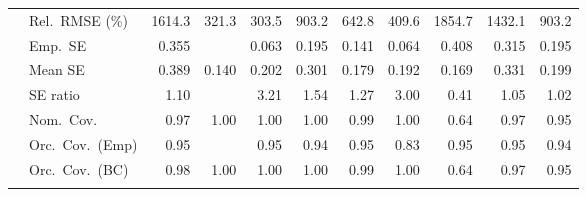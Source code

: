 \begin{landscape}
\begin{longtable}{llrrrrrrrrr}
 & Rel.\ RMSE (\%) & 1614.3 & \cellcolor{ranktwo}321.3 & \cellcolor{rankone}303.5 & 903.2 & 642.8 & \cellcolor{rankthree}409.6 & 1854.7 & 1432.1 & 903.2 \\
 & Emp.\ SE & 0.355 &  & 0.063 & 0.195 & 0.141 & 0.064 & 0.408 & 0.315 & 0.195 \\
 & Mean SE & 0.389 & 0.140 & 0.202 & 0.301 & 0.179 & 0.192 & 0.169 & 0.331 & 0.199 \\
 & SE ratio & \cellcolor{rankthree}1.10 &  & 3.21 & 1.54 & 1.27 & 3.00 & 0.41 & \cellcolor{ranktwo}1.05 & \cellcolor{rankone}1.02 \\
 & Nom.\ Cov. & \cellcolor{ranktwo}0.97 & 1.00 & 1.00 & 1.00 & \cellcolor{rankthree}0.99 & 1.00 & 0.64 & \cellcolor{ranktwo}0.97 & \cellcolor{rankone}0.95 \\
 & Orc.\ Cov.\ (Emp) & \cellcolor{rankone}0.95 &  & \cellcolor{rankone}0.95 & \cellcolor{ranktwo}0.94 & \cellcolor{rankone}0.95 & \cellcolor{rankthree}0.83 & \cellcolor{rankone}0.95 & \cellcolor{rankone}0.95 & \cellcolor{ranktwo}0.94 \\
 & Orc.\ Cov.\ (BC) & \cellcolor{rankthree}0.98 & 1.00 & 1.00 & 1.00 & 0.99 & 1.00 & 0.64 & \cellcolor{ranktwo}0.97 & \cellcolor{rankone}0.95 \\
\addlinespace[2pt]
\end{longtable}
\end{landscape}

